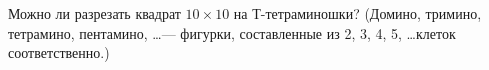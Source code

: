 Можно ли разрезать квадрат $10 \times 10$ на Т-тетраминошки? (Домино, тримино,
тетрамино, пентамино, \dots --- фигурки, составленные из 2, 3, 4, 5, \dots клеток
соответственно.)